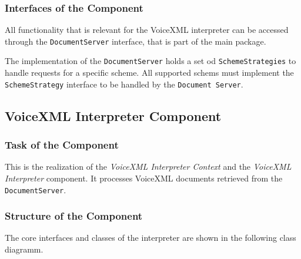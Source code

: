 \documentclass[11pt,a4paper]{article}
\begin{document}
\subsubsection{Interfaces of the Component}

All functionality that is relevant for the VoiceXML interpreter can be accessed
through the \texttt{DocumentServer} interface, that is part of the main package.

The implementation of the \texttt{DocumentServer} holds a set od
\texttt{SchemeStrategies} to handle requests for a specific scheme.
All supported schems must implement the \texttt{SchemeStrategy} interface to be
handled by the \texttt{Document Server}.

\subsection{VoiceXML Interpreter Component}
\label{sec:voic-interpr-comp}

\subsubsection{Task of the Component}

This is the realization of the 
\emph{VoiceXML Interpreter Context} and the \emph{VoiceXML Interpreter}
component. It processes VoiceXML documents retrieved from the
\texttt{DocumentServer}.

\subsubsection{Structure of the Component}

The core interfaces and classes of the interpreter are shown in the following
class diagramm.
\end{document}
